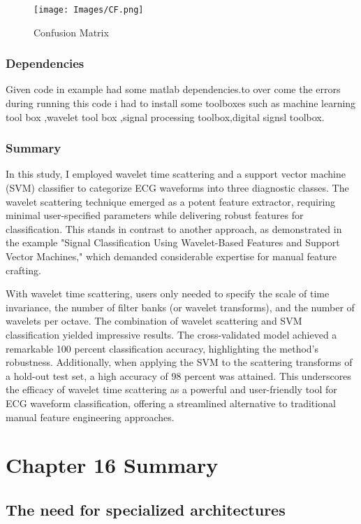 \documentclass{article}
\begin{document}
\begin{figure}
    \centering
    \texttt{[image: Images/CF.png]}
    \caption{Confusion Matrix}
    \label{fig:enter-labe}
\end{figure}

\subsubsection{Dependencies}
Given code in example had some matlab dependencies.to over come the errors during running this code i had to install some toolboxes such as machine learning tool box ,wavelet tool box ,signal processing toolbox,digital signsl toolbox.

\subsubsection{Summary}
In this study, I  employed wavelet time scattering and a support vector machine (SVM) classifier to categorize ECG waveforms into three diagnostic classes. The wavelet scattering technique emerged as a potent feature extractor, requiring minimal user-specified parameters while delivering robust features for classification. This stands in contrast to another approach, as demonstrated in the example "Signal Classification Using Wavelet-Based Features and Support Vector Machines," which demanded considerable expertise for manual feature crafting.

With wavelet time scattering, users only needed to specify the scale of time invariance, the number of filter banks (or wavelet transforms), and the number of wavelets per octave. The combination of wavelet scattering and SVM classification yielded impressive results. The cross-validated model achieved a remarkable 100 percent classification accuracy, highlighting the method's robustness. Additionally, when applying the SVM to the scattering transforms of a hold-out test set, a high accuracy of 98 percent  was attained. This underscores the efficacy of wavelet time scattering as a powerful and user-friendly tool for ECG waveform classification, offering a streamlined alternative to traditional manual feature engineering approaches.


\section{Chapter 16 Summary}

\subsection{The need for specialized architectures}
\end{document}
